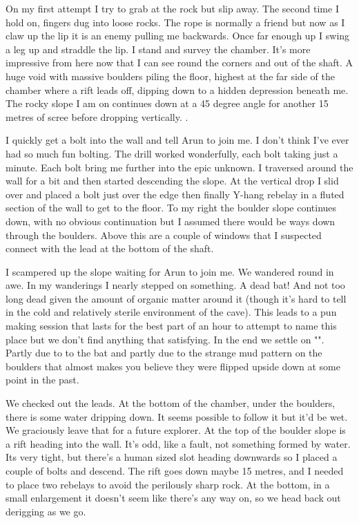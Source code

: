 On my first attempt I try to grab at the rock but slip away. The second time I hold on, fingers dug into loose rocks. The rope is normally a friend but now as I claw up the lip it is an enemy pulling me backwards. Once far enough up I swing a leg up and straddle the lip. I stand and survey the chamber. It's more impressive from here now that I can see round the corners and out of the shaft. A huge void with massive boulders piling the floor, highest at the far side of the chamber where a rift leads off, dipping down to a hidden depression beneath me. The rocky slope I am on continues down at a 45 degree angle for another 15 metres of scree before dropping vertically. . 

I quickly get a bolt into the wall and tell Arun to join me. I don't think I've ever had so much fun bolting. The drill worked wonderfully, each bolt taking just a minute. Each bolt bring me further into the epic unknown. I traversed around the wall for a bit and then started descending the slope. At the vertical drop I slid over and placed a bolt just over the edge then finally Y-hang rebelay in a fluted section of the wall to get to the floor. To my right the boulder slope continues down, with no obvious continuation but I assumed there would be ways down through the boulders. Above this are a couple of windows that I suspected connect with the lead at the bottom of the shaft.

I scampered up the slope waiting for Arun to join me. We wandered round in awe. In my wanderings I nearly stepped on something. A dead bat! And not too long dead given the amount of organic matter around it (though it's hard to tell in the cold and relatively sterile environment of the cave). This leads to a pun making session that lasts for the best part of an hour to attempt to name this place but we don't find anything that satisfying. In the end we settle on "". Partly due to to the bat and partly due to the strange mud pattern on the boulders that almost makes you believe they were flipped upside down at some point in the past.

We checked out the leads. At the bottom of the chamber, under the boulders, there is some water dripping down. It seems possible to follow it but it'd be wet. We graciously leave that for a future explorer. At the top of the boulder slope is a rift heading into the wall. It's odd, like a fault, not something formed by water. Its very tight, but there's a human sized slot heading downwards so I placed a couple of bolts and descend. The rift goes down maybe 15 metres, and I needed to place two rebelays to avoid the perilously sharp rock. At the bottom, in a small enlargement it doesn't seem like there's any way on, so we head back out derigging as we go. 


